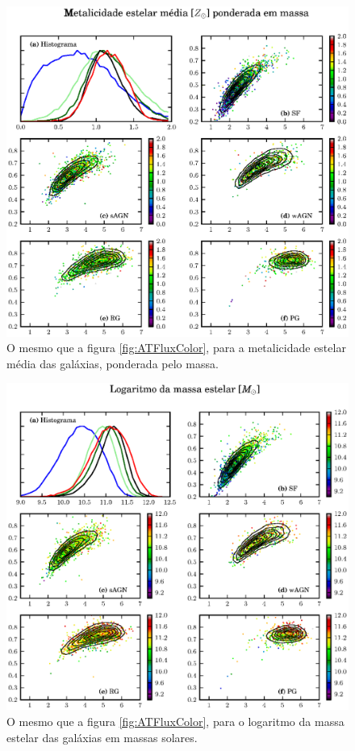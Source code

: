 \begin{figure}
	\includegraphics{figuras/uvcolor-color-am_mass-byclass.eps}
	\caption[Metalicidade estelar média ponderada em massa no diagrama cor--cor.]
	{O mesmo que a figura \ref{fig:ATFluxColor}, para a metalicidade estelar média
	das galáxias, ponderada pelo massa.}
	\label{fig:AMMassColor}
\end{figure}

\begin{figure}
	\includegraphics{figuras/uvcolor-color-mcor_gal-byclass.eps}
	\caption[Massa estelar das galáxias no diagrama cor--cor.]
	{O mesmo que a figura \ref{fig:ATFluxColor}, para o logaritmo da massa estelar
	das galáxias em massas solares.}
	\label{fig:MCorGalColor}
\end{figure}

